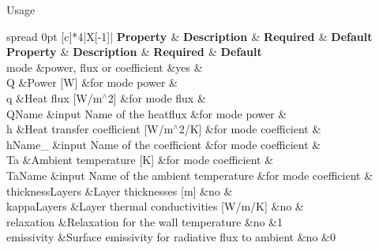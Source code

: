 \begin{DoxyParagraph}{Usage}
\tabulinesep=1mm
\begin{longtabu} spread 0pt [c]{*{4}{|X[-1]}|}
\hline
\rowcolor{\tableheadbgcolor}\PBS\centering \textbf{ {\bfseries  Property } }&\PBS\centering \textbf{ {\bfseries  Description } }&\PBS\centering \textbf{ {\bfseries  Required } }&\PBS\centering \textbf{ {\bfseries  Default}  }\\
\endfirsthead
\hline
\endfoot
\hline
\rowcolor{\tableheadbgcolor}\PBS\centering \textbf{ {\bfseries  Property } }&\PBS\centering \textbf{ {\bfseries  Description } }&\PBS\centering \textbf{ {\bfseries  Required } }&\PBS\centering \textbf{ {\bfseries  Default}  }\\
\endhead
{\ttfamily mode}  &\textquotesingle{}power\textquotesingle{}, \textquotesingle{}flux\textquotesingle{} or \textquotesingle{}coefficient\textquotesingle{}  &yes  &\\
{\ttfamily Q}  &Power \mbox{[}W\mbox{]}  &for mode \textquotesingle{}power\textquotesingle{}  &\\
{\ttfamily q}  &Heat flux \mbox{[}W/m$^\wedge$2\mbox{]}  &for mode \textquotesingle{}flux\textquotesingle{}  &\\
{\ttfamily Q\+Name}  &input Name of the heatflux  &for mode \textquotesingle{}power\textquotesingle{}  &\\
{\ttfamily h}  &Heat transfer coefficient \mbox{[}W/m$^\wedge$2/K\mbox{]}  &for mode \textquotesingle{}coefficient\textquotesingle{}  &\\
{\ttfamily h\+Name\+\_\+}  &input Name of the coefficient  &for mode \textquotesingle{}coefficient\textquotesingle{}  &\\
{\ttfamily Ta}  &Ambient temperature \mbox{[}K\mbox{]}  &for mode \textquotesingle{}coefficient\textquotesingle{}  &\\
{\ttfamily Ta\+Name}  &input Name of the ambient temperature  &for mode \textquotesingle{}coefficient\textquotesingle{}  &\\
{\ttfamily thickness\+Layers}  &Layer thicknesses \mbox{[}m\mbox{]}  &no  &\\
{\ttfamily kappa\+Layers}  &Layer thermal conductivities \mbox{[}W/m/K\mbox{]}  &no  &\\
{\ttfamily relaxation}  &Relaxation for the wall temperature  &no  &1  \\
{\ttfamily emissivity}  &Surface emissivity for radiative flux to ambient  &no  &0  \\

\end{longtabu}
\end{DoxyParagraph}
